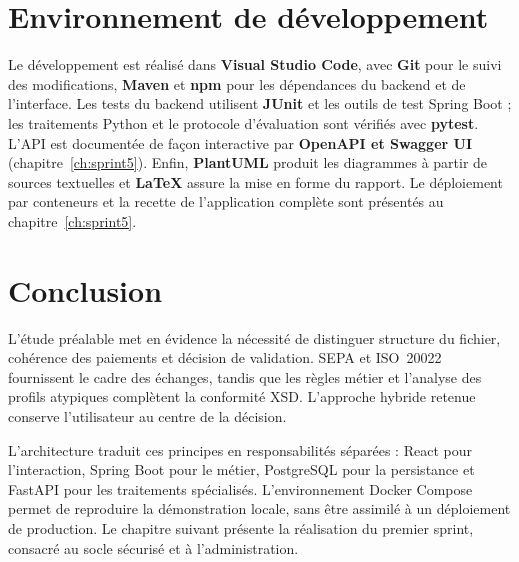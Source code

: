\section{Environnement de développement}

Le développement est réalisé dans \textbf{Visual Studio Code}, avec \textbf{Git} pour le suivi des modifications, \textbf{Maven} et \textbf{npm} pour les dépendances du backend et de l'interface. Les tests du backend utilisent \textbf{JUnit} et les outils de test Spring Boot ; les traitements Python et le protocole d'évaluation sont vérifiés avec \textbf{pytest}. L'API est documentée de façon interactive par \textbf{OpenAPI et Swagger UI} (chapitre~\ref{ch:sprint5}). Enfin, \textbf{PlantUML} produit les diagrammes à partir de sources textuelles et \textbf{LaTeX} assure la mise en forme du rapport. Le déploiement par conteneurs et la recette de l'application complète sont présentés au chapitre~\ref{ch:sprint5}.

\section{Conclusion}

L'étude préalable met en évidence la nécessité de distinguer structure du fichier, cohérence des paiements et décision de validation. SEPA et ISO~20022 fournissent le cadre des échanges, tandis que les règles métier et l'analyse des profils atypiques complètent la conformité XSD. L'approche hybride retenue conserve l'utilisateur au centre de la décision.

L'architecture traduit ces principes en responsabilités séparées : React pour l'interaction, Spring Boot pour le métier, PostgreSQL pour la persistance et FastAPI pour les traitements spécialisés. L'environnement Docker Compose permet de reproduire la démonstration locale, sans être assimilé à un déploiement de production. Le chapitre suivant présente la réalisation du premier sprint, consacré au socle sécurisé et à l'administration.

